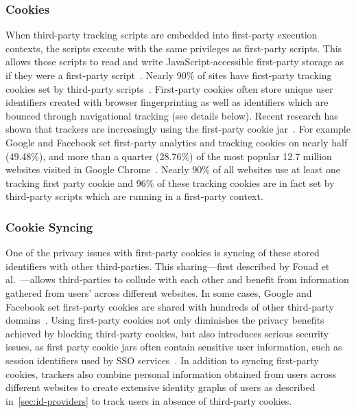 \subsubsection{Cookies}
\label{subsubsec:stateful-tracking-cookies}
When third-party tracking scripts are embedded into first-party execution contexts, the scripts execute with the same privileges as first-party scripts. 
%
This allows those scripts to read and write JavaScript-accessible first-party storage as if they were a first-party script~\cite{bahramiCOOKIEGUARDCharacterizingIsolating2024}. 
%
Nearly 90\% of sites have first-party tracking cookies set by third-party scripts~\cite{munirCookieGraphUnderstandingDetecting2023}. 
%
First-party cookies often store unique user identifiers created with browser fingerprinting as well as identifiers which are bounced through navigational tracking (see details below). 
%
Recent research has shown that trackers are increasingly using the first-party cookie jar~\cite{munirCookieGraphUnderstandingDetecting2023,vekaria2024WebAlmanac2024}. 
%
For example Google and Facebook set first-party analytics and tracking cookies on nearly half (49.48\%), and more than a quarter (28.76\%) of the most popular 12.7 million websites visited in Google Chrome~\cite{vekaria2024WebAlmanac2024}. 
%
Nearly 90\% of all websites use at least one tracking first party cookie and 96\% of these tracking cookies are in fact set by third-party scripts which are running in a first-party context.

\subsubsection{Cookie Syncing}
One of the privacy issues with first-party cookies is syncing of these stored identifiers with other third-parties. 
%
This sharing---first described by Fouad et al.~\cite{fouadMissedFilterLists2020}---allows third-parties to collude with each other and benefit from information gathered from users’ across different websites. 
%
In some cases, Google and Facebook set first-party cookies are shared with hundreds of other third-party domains~\cite{munirCookieGraphUnderstandingDetecting2023}. 
%
Using first-party cookies not only diminishes the privacy benefits achieved by blocking third-party cookies, but also introduces serious security issues, as first party cookie jars often contain sensitive user information, such as session identifiers used by SSO services~\cite{bahramiCOOKIEGUARDCharacterizingIsolating2024}. 
%
In addition to syncing first-party cookies, trackers also combine personal information obtained from users across different websites to create extensive identity graphs of users as described in~\autoref{sec:id-providers} to track users in absence of third-party cookies.

